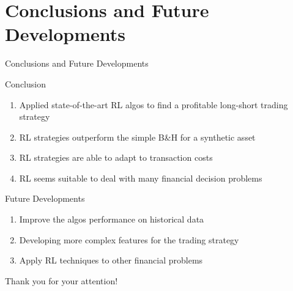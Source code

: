 \section{Conclusions and Future Developments}
\label{sec:conclusions}

\begin{frame}[c]{Conclusions and Future Developments}
	\begin{block}{Conclusion}
		\begin{enumerate}
			\item Applied state-of-the-art RL algos to find a profitable long-short trading strategy
			\item RL strategies outperform the simple B\&H for a synthetic asset
			\item RL strategies are able to adapt to transaction costs
			\item RL seems suitable to deal with many financial decision problems 
			
		\end{enumerate}
	\end{block}
	
	\begin{block}{Future Developments}
		\begin{enumerate}
			\item Improve the algos performance on historical data
			\item Developing more complex features for the trading strategy
			\item Apply RL techniques to other financial problems 
		\end{enumerate}
	\end{block}
\end{frame}

\begin{frame}[c]{}
  \begin{center}
	  \Huge Thank you for your attention!
  \end{center} 
\end{frame}